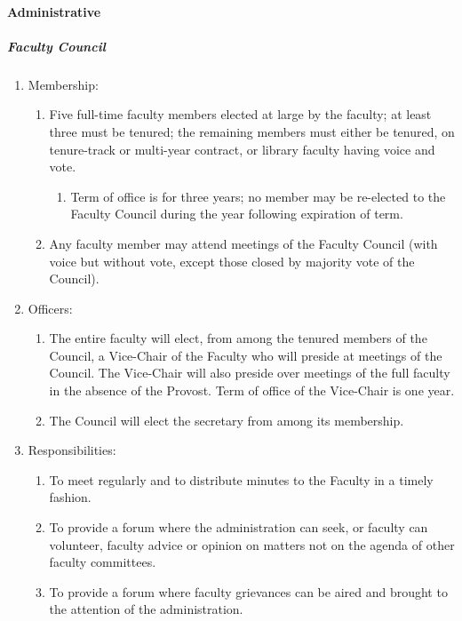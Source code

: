 \documentclass[letterpaper, 11pt]{article}
\begin{document}
			\paragraph{Administrative}
				\subparagraph{Faculty Council}
					\begin{enumerate}[label=\alph*)]
						\item{Membership:
							\begin{enumerate}[label=\arabic*)]
								\item{Five full-time faculty members elected at large by the faculty; at least three must be tenured; the remaining members must either be tenured, on tenure-track or multi-year contract, or library faculty having voice and vote.
									\begin{enumerate}[label=(\alph*)]
										\item{Term of office is for three years; no member may be re-elected to the Faculty Council during the year following expiration of term.}
									\end{enumerate}
								}
								\item{Any faculty member may attend meetings of the Faculty Council (with voice but without vote, except those closed by majority vote of the Council).}
							\end{enumerate}
						}
						\item{Officers:
							\begin{enumerate}[label=\arabic*)]
								\item{The entire faculty will elect, from among the tenured members of the Council, a Vice-Chair of the Faculty who will preside at meetings of the Council.  The Vice-Chair will also preside over meetings of the full faculty in the absence of the Provost.  Term of office of the Vice-Chair is one year.}
								\item{The Council will elect the secretary from among its membership.}
							\end{enumerate}
						}
						\item{Responsibilities:
							\begin{enumerate}[label=\arabic*)]
								\item{To meet regularly and to distribute minutes to the Faculty in a timely fashion.}
								\item{To provide a forum where the administration can seek, or faculty can volunteer, faculty advice or opinion on matters not on the agenda of other faculty committees.}
								\item{To provide a forum where faculty grievances can be aired and brought to the attention of the administration.}

\end{enumerate}}
\end{enumerate}
\end{document}
